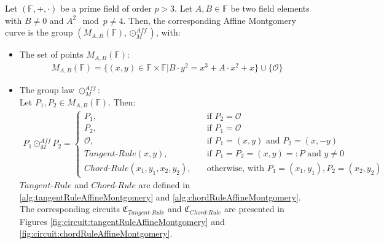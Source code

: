 \begin{definition}
    \label{def:affineMontgomeryCurve}
    Let $(\mathbb{F}, +, \cdot)$ be a prime field of order $p>3$.
    Let $A, B\in\mathbb{F}$ be two field elements with $B\neq 0$ and $A^2\mod p\neq4$.
    Then, the corresponding Affine Montgomery curve is the group $(M_{A,B}(\mathbb{F}), \odot_M^{Aff})$, with:
    \begin{itemize}
        \item The set of points $M_{A,B}(\mathbb{F})$:
        \begin{align*}
            M_{A,B}(\mathbb{F})=\{(x,y)\in\mathbb{F}\times\mathbb{F}|B\cdot y^2=x^3+A\cdot x^2+x\}\cup \{\mathcal{O}\}
        \end{align*}
        \item The group law $\odot_M^{Aff}$:\\
        Let $P_1, P_2\in M_{A,B}(\mathbb{F})$.
        Then:
        {\setlength{\mathindent}{0pt}
        \begin{align*}
            P_1\odot_M^{Aff} P_2 =\begin{cases}
                P_1, &\quad\text{if } P_2=\mathcal{O}\\
                P_2, &\quad\text{if } P_1=\mathcal{O}\\
                \mathcal{O}, &\quad\text{if } P_1=(x, y) \text{ and } P_2=(x, -y)\\
                Tangent\text{-}Rule(x,y), &\quad\text{if } P_1=P_2=(x,y)=:P \text{ and } y\neq 0\\
                Chord\text{-}Rule(x_1, y_1, x_2, y_2), &\quad\text{otherwise, with } P_1=(x_1, y_1), P_2=(x_2, y_2)
            \end{cases}
        \end{align*}
        }
        $Tangent\text{-}Rule$ and $Chord\text{-}Rule$ are defined in \cref{alg:tangentRuleAffineMontgomery} and \cref{alg:chordRuleAffineMontgomery}.
        The corresponding circuits $\mathfrak{C}_{Tangent\text{-}Rule}$ and $\mathfrak{C}_{Chord\text{-}Rule}$ are presented in Figures \ref{fig:circuit:tangentRuleAffineMontgomery} and \ref{fig:circuit:chordRuleAffineMontgomery}.

\end{itemize}
\end{definition}
